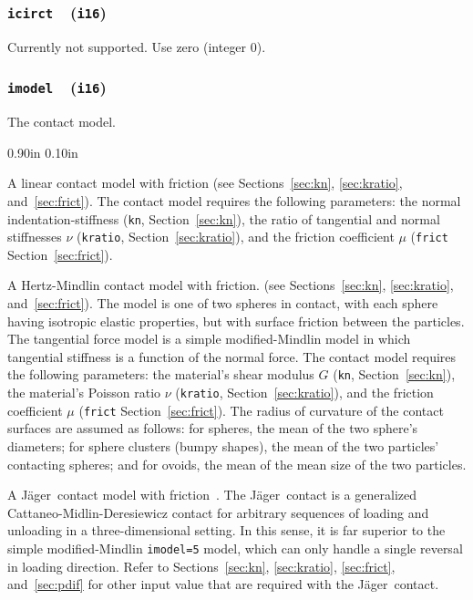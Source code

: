 \documentclass[letterpaper,11pt]{article}
\newcommand{\Var}[2]{\texttt{#1}\ \  (\texttt{#2})}
\newlength{\Labelwidth}
\newcommand{\Entrylabel}[1]{\makebox[\Labelwidth][r]{\texttt{#1}}}
\newenvironment{Options}
{\begin{list}{}{%
\renewcommand{\makelabel}{\Entrylabel}%
\setlength{\leftmargin} {0.90in}%
\setlength{\rightmargin}{0.00in}%
\setlength{\labelsep}   {0.10in}%
\setlength{\labelwidth} {\Labelwidth}%
}}
{\end{list}}
\begin{document}
\subsubsection[\texttt{icirct}]{\Var{icirct}{i16}}
Currently not supported.
Use zero (integer 0).
%
\subsubsection[\texttt{imodel}]{\Var{imodel}{i16}}\label{sec:imodel}
The contact model.
\begin{Options}
\item[imodel=0]
A linear contact model with friction 
(see Sections~\ref{sec:kn}, \ref{sec:kratio}, and~\ref{sec:frict}).
The contact model requires the following parameters:
the normal indentation-stiffness (\texttt{kn}, Section~\ref{sec:kn}),
the ratio of tangential and normal stiffnesses $\nu$
(\texttt{kratio}, Section~\ref{sec:kratio}),
and the friction coefficient $\mu$ (\texttt{frict} Section~\ref{sec:frict}).
%
\item[imodel=5]
A Hertz-Mindlin contact model with friction.
(see Sections~\ref{sec:kn}, \ref{sec:kratio}, and~\ref{sec:frict}).
The model is one of two spheres in contact, with each sphere having
isotropic elastic properties, but with surface friction
between the particles.
The tangential force model is a simple modified-Mindlin model in
which tangential stiffness is a function of the normal force.
The contact model requires the following parameters:
the material's shear modulus $G$ (\texttt{kn}, Section~\ref{sec:kn}),
the material's Poisson ratio $\nu$
(\texttt{kratio}, Section~\ref{sec:kratio}),
and the friction coefficient $\mu$ (\texttt{frict} Section~\ref{sec:frict}).
The radius of curvature of the contact surfaces are assumed
as follows: 
for spheres, the mean of the two sphere's diameters;
for sphere clusters (bumpy shapes), the mean
of the two particles' contacting spheres;
and for ovoids, the mean of the mean size of the
two particles.
%
\item[imodel=6]
A J\"{a}ger\ contact model with 
friction~\citep{Jager:2005a,Kuhn:2011a}.
The J\"{a}ger\ contact is a generalized Cattaneo-Midlin-Deresiewicz contact
for arbitrary sequences of loading and unloading in a three-dimensional
setting.  In this sense, it is far superior to the
simple modified-Mindlin
\texttt{imodel=5} model, which can only handle a single
reversal in loading direction.
Refer to Sections~\ref{sec:kn}, \ref{sec:kratio}, \ref{sec:frict},
and~\ref{sec:pdif}
for other input value that are required with the J\"{a}ger\ contact.

\end{Options}
\end{document}
